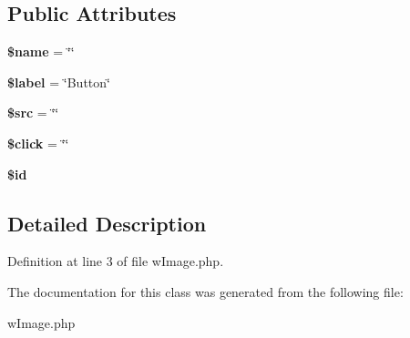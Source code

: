 \subsection*{Public Attributes}
\begin{DoxyCompactItemize}
\item 
\hypertarget{classwImage_a8f91fdb684d8f5af4bcf1a1835eb079e}{
{\bfseries \$name} = \char`\"{}\char`\"{}}
\label{classwImage_a8f91fdb684d8f5af4bcf1a1835eb079e}

\item 
\hypertarget{classwImage_a949954048364902dba73ec70ae6f2c32}{
{\bfseries \$label} = \char`\"{}Button\char`\"{}}
\label{classwImage_a949954048364902dba73ec70ae6f2c32}

\item 
\hypertarget{classwImage_a41c2848c583c9d707a70be54b0e97e0f}{
{\bfseries \$src} = \char`\"{}\char`\"{}}
\label{classwImage_a41c2848c583c9d707a70be54b0e97e0f}

\item 
\hypertarget{classwImage_ab0ada74249521ae3b02ae6951f44c92e}{
{\bfseries \$click} = \char`\"{}\char`\"{}}
\label{classwImage_ab0ada74249521ae3b02ae6951f44c92e}

\item 
\hypertarget{classwImage_a2cd8bf3c77283f74edb8def5266822b2}{
{\bfseries \$id}}
\label{classwImage_a2cd8bf3c77283f74edb8def5266822b2}

\end{DoxyCompactItemize}


\subsection{Detailed Description}


Definition at line 3 of file wImage.php.



The documentation for this class was generated from the following file:\begin{DoxyCompactItemize}
\item 
wImage.php\end{DoxyCompactItemize}
